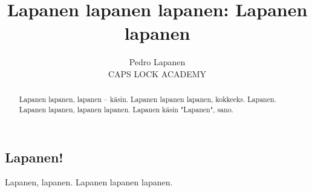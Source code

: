 \documentclass[a4paper]{article}
\title{Lapanen lapanen lapanen: Lapanen lapanen}
\date{}
\author{Pedro Lapanen\\CAPS LOCK ACADEMY}
\begin{document}
\maketitle
\renewcommand{\abstractname}{Lapaslapanen}
\begin{abstract}
Lapanen lapanen, lapanen -- käsin. Lapanen lapanen lapanen, kokkeeks. Lapanen. Lapanen lapanen, lapanen lapanen.
Lapanen käsin "Lapanen", sano.
\end{abstract}
\begin{multicols}{2}
\section{Lapanen!}
Lapanen, lapanen. Lapanen lapanen lapanen.
\end{multicols}
\end{document}
